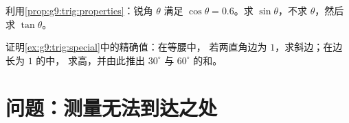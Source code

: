 \begin{exercise}[$\star\star$]\label{exo:g9:trig:8}
利用\cref{prop:g9:trig:properties}：锐角 $\theta$ 满足
$\cos\theta = 0.6$。求 $\sin\theta$，不求 $\theta$，然后
求 $\tan\theta$。
\end{exercise}

\begin{exercise}[$\star\star\star$]\label{exo:g9:trig:9}
证明\cref{ex:g9:trig:special}中的精确值：在等腰中，
若两直角边为 $1$，求斜边；在边长为 $1$ 的中，
求高，并由此推出
$30^\circ$ 与 $60^\circ$ 的和。
\end{exercise}

\section{问题：测量无法到达之处}

